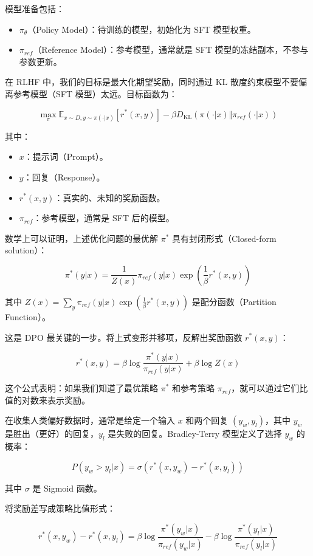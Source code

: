 模型准备包括：

\begin{itemize}
\tightlist
\item
  \(\pi_\theta\)（Policy Model）：待训练的模型，初始化为 SFT 模型权重。
\item
  \(\pi_{ref}\)（Reference Model）：参考模型，通常就是 SFT 模型的冻结副本，不参与参数更新。
\end{itemize}

在 RLHF 中，我们的目标是最大化期望奖励，同时通过 KL 散度约束模型不要偏离参考模型（SFT 模型）太远。目标函数为：

\[
\max_{\pi}\mathbb{E}_{x\sim D,y\sim\pi(\cdot|x)}[r^*(x,y)]-\beta D_{\mathrm{KL}}(\pi(\cdot|x)\Vert\pi_{ref}(\cdot|x))
\]

其中：

\begin{itemize}
\tightlist
\item
  \(x\)：提示词（Prompt）。
\item
  \(y\)：回复（Response）。
\item
  \(r^*(x,y)\)：真实的、未知的奖励函数。
\item
  \(\pi_{ref}\)：参考模型，通常是 SFT 后的模型。
\end{itemize}

数学上可以证明，上述优化问题的最优解 \(\pi^*\) 具有封闭形式（Closed-form solution）：

\[
\pi^*(y|x)=\frac{1}{Z(x)}\pi_{ref}(y|x)\exp\left(\frac{1}{\beta}r^*(x,y)\right)
\]

其中 \(Z(x)=\sum_y\pi_{ref}(y|x)\exp\left(\frac{1}{\beta}r^*(x,y)\right)\) 是配分函数（Partition Function）。

这是 DPO 最关键的一步。将上式变形并移项，反解出奖励函数 \(r^*(x,y)\)：

\[
r^*(x,y)=\beta\log\frac{\pi^*(y|x)}{\pi_{ref}(y|x)}+\beta\log Z(x)
\]

这个公式表明：如果我们知道了最优策略 \(\pi^*\) 和参考策略 \(\pi_{ref}\)，就可以通过它们比值的对数来表示奖励。

在收集人类偏好数据时，通常是给定一个输入 \(x\) 和两个回复 \((y_w,y_l)\)，其中 \(y_w\) 是胜出（更好）的回复，\(y_l\) 是失败的回复。Bradley-Terry 模型定义了选择 \(y_w\) 的概率：

\[
P(y_w>y_l|x)=\sigma(r^*(x,y_w)-r^*(x,y_l))
\]

其中 \(\sigma\) 是 Sigmoid 函数。

将奖励差写成策略比值形式：

\[
r^*(x,y_w)-r^*(x,y_l)=\beta\log\frac{\pi^*(y_w|x)}{\pi_{ref}(y_w|x)}-\beta\log\frac{\pi^*(y_l|x)}{\pi_{ref}(y_l|x)}
\]


